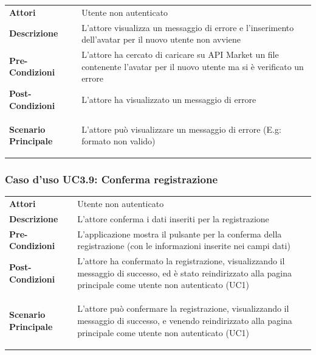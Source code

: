 \begin{minipage}{\linewidth}
	\begin{tabular}{ l | p{11cm}}
		\hline
		\rowcolor{Gray}
		\multicolumn{2}{c}{UC3.8 - Errore inserimento avatar} \\
		\hline
		\textbf{Attori} & Utente non autenticato \\
		\textbf{Descrizione} & L'attore visualizza un messaggio di errore e l'inserimento dell'avatar per il nuovo utente non avviene \\
		\textbf{Pre-Condizioni} & L'attore ha cercato di caricare su API Market un file contenente l'avatar per il nuovo utente ma si è verificato un errore \\
		\textbf{Post-Condizioni} & L'attore ha visualizzato un messaggio di errore \\
		\textbf{Scenario Principale} & 
		\begin{enumerate*}[label=(\arabic*.),itemjoin={\newline}]
			\item L'attore può visualizzare un messaggio di errore (E.g: formato non valido)
		\end{enumerate*}\\
	\end{tabular}
\end{minipage}

\subsubsection{Caso d'uso UC3.9: Conferma registrazione}
\label{UC3_9}

\begin{longtable}{ l | p{11cm}}
	\hline
	\rowcolor{Gray}
	 \multicolumn{2}{c}{UC3.9 - Conferma registrazione} \\
	 \hline
	\textbf{Attori} & Utente non autenticato \\
	\textbf{Descrizione} & L'attore conferma i dati inseriti per la registrazione \\
	\textbf{Pre-Condizioni} & L'applicazione mostra il pulsante per la conferma della registrazione (con le informazioni inserite nei campi dati) \\
	\textbf{Post-Condizioni} & L'attore ha confermato la registrazione, visualizzando il messaggio di successo, ed è stato reindirizzato alla pagina principale come utente non autenticato (UC1) \\
	\textbf{Scenario Principale} & 
	\begin{enumerate*}[label=(\arabic*.),itemjoin={\newline}]
		\item L'attore può confermare la registrazione, visualizzando il messaggio di successo, e venendo reindirizzato alla pagina principale come utente non autenticato (UC1)
	\end{enumerate*}\\
\end{longtable}

